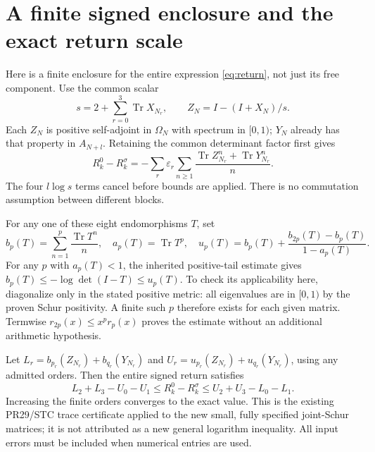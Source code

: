 \documentclass[11pt,a4paper]{article}
\newcommand{\Tr}{\operatorname{Tr}}
\newcommand{\eps}{\varepsilon}
\begin{document}
\section{A finite signed enclosure and the exact return scale}\label{sec:bound}
Here is a finite enclosure for the entire expression \eqref{eq:return}, not just its free component. Use the common scalar
\begin{equation}
 s=2+\sum_{r=0}^3\Tr X_{N_r},\qquad
 Z_N=I-(I+X_N)/s.
\end{equation}
Each $Z_N$ is positive self-adjoint in $\Omega_N$ with spectrum in $[0,1)$; $Y_N$ already has that property in $A_{N+l}$. Retaining the common determinant factor first gives
\begin{equation}
 R_k^0-R_k^\sigma
 =-\sum_r\eps_r\sum_{n\ge1}
 \frac{\Tr Z_{N_r}^n+\Tr Y_{N_r}^n}{n}.
 \label{eq:series}
\end{equation}
The four $l\log s$ terms cancel before bounds are applied. There is no commutation assumption between different blocks.

For any one of these eight endomorphisms $T$, set
\begin{equation}
 b_p(T)=\sum_{n=1}^p\frac{\Tr T^n}{n},\quad a_p(T)=\Tr T^p,\quad
 u_p(T)=b_p(T)+\frac{b_{2p}(T)-b_p(T)}{1-a_p(T)}.
\end{equation}
For any $p$ with $a_p(T)<1$, the inherited positive-tail estimate gives
$b_p(T)\le-\log\det(I-T)\le u_p(T)$. To check its applicability here, diagonalize only in the stated positive metric: all eigenvalues are in $[0,1)$ by the proven Schur positivity. A finite such $p$ therefore exists for each given matrix. Termwise $r_{2p}(x)\le x^pr_p(x)$ proves the estimate without an additional arithmetic hypothesis.

Let $L_r=b_{p_r}(Z_{N_r})+b_{q_r}(Y_{N_r})$ and
$U_r=u_{p_r}(Z_{N_r})+u_{q_r}(Y_{N_r})$, using any admitted orders. Then the entire signed return satisfies
\begin{equation}
 \boxed{L_2+L_3-U_0-U_1\le R_k^0-R_k^\sigma
 \le U_2+U_3-L_0-L_1.}\label{eq:cert}
\end{equation}
Increasing the finite orders converges to the exact value. This is the existing PR29/STC trace certificate applied to the new small, fully specified joint-Schur matrices; it is not attributed as a new general logarithm inequality. All input errors must be included when numerical entries are used.
\end{document}
